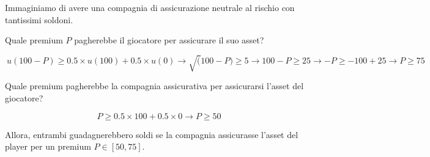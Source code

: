 Immaginiamo di avere una compagnia di assicurazione neutrale al rischio con
tantissimi soldoni.

Quale premium $P$ pagherebbe il giocatore per assicurare il suo asset?

\[\
    u(100-P) \geq 0.5 \times u(100) + 0.5 \times u(0) \rightarrow \sqrt(100-P) \geq 5 \rightarrow 100-P \geq 25 \rightarrow -P \geq -100+25 \rightarrow P \geq 75
\]

Quale premium pagherebbe la compagnia assicurativa per assicurarsi l'asset del
giocatore?

\[
    P \geq 0.5 \times 100 + 0.5 \times 0 \rightarrow P \geq 50
\]

Allora, entrambi guadagnerebbero soldi se la compagnia assicurasse l'asset del
player per un premium $P \in [50,75]$.

\newpage